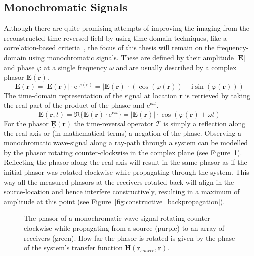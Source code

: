 \subsection{Monochromatic Signals}
Although there are quite promising attempts of improving the imaging from the reconstructed time-reversed field by using time-domain techniques, like a correlation-based criteria~\parencite{li_correlation-based_2021}, the focus of this thesis will remain on the frequency-domain using monochromatic signals.
These are defined by their amplitude \(|\bm{E}|\) and phase \(\varphi \) at a single frequency \(\omega \) and are usually described by a complex phasor \(\underline{\bm{E}}(\bm{r})\).
\begin{equation}
    \underline{\bm{E}}(\bm{r}) = |\bm{E}(\bm{r})| \cdot \mathrm{e}^{\mathrm{i} \varphi(\bm{r})} = |\bm{E}(\bm{r})| \cdot (\cos(\varphi(\bm{r})) + \mathrm{i} \sin(\varphi(\bm{r})))
\end{equation}
The time-domain representation of the signal at location \(\bm{r}\) is retrieved by taking the real part of the product of the phasor and \(\mathrm{e}^{\mathrm{i} \omega t}\).
\begin{equation}
    \bm{E}(\bm{r}, t) = \Re \{\underline{\bm{E}}(\bm{r}) \cdot \mathrm{e}^{\mathrm{i} \omega t}\} = |\bm{E}(\bm{r})| \cdot \cos(\varphi(\bm{r}) + \omega t)
\end{equation}
For the phasor \(\underline{\bm{E}}(\bm{r})\) the time-reversal operator \(\mathcal{T}\) is simply a reflection along the real axis or (in mathematical terms) a negation of the phase.
Observing a monochromatic wave-signal along a ray-path through a system can be modelled by the phasor rotating counter-clockwise in the complex plane (see Figure~\ref{fig:phasor_propagation}).
Reflecting the phasor along the real axis will result in the same phasor as if the initial phasor was rotated clockwise while propagating through the system.
This way all the measured phasors at the receivers rotated back will align in the source-location and hence interfere constructively, resulting in a maximum of amplitude at this point (see Figure~\ref{fig:constructive_backpropagation}).  

\begin{figure}
    \centering
    \def\svgwidth{0.8\textwidth}
    
    \caption{The phasor of a monochromatic wave-signal rotating counter-clockwise while propagating from a source (purple) to an array of receivers (green). How far the phasor is rotated is given by the phase of the system's transfer function \(\bm{H}(\bm{r}_{source}, \bm{r})\).}\label{fig:phasor_propagation}
\end{figure}

